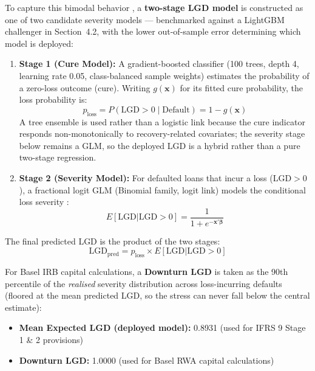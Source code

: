 \documentclass[11pt,a4paper]{article}
\begin{document}
To capture this bimodal behavior \parencite{schuermann2004}, a \textbf{two-stage LGD model} is constructed as one of two candidate severity models --- benchmarked against a LightGBM challenger in Section~4.2, with the lower out-of-sample error determining which model is deployed:
\begin{enumerate}
    \item \textbf{Stage 1 (Cure Model):} A gradient-boosted classifier (100 trees, depth 4, learning rate 0.05, class-balanced sample weights) estimates the probability of a zero-loss outcome (cure). Writing $g(\mathbf{x})$ for its fitted cure probability, the loss probability is:
    \begin{equation}
    p_{\text{loss}} = P(\text{LGD} > 0 \mid \text{Default}) = 1 - g(\mathbf{x})
    \end{equation}
    A tree ensemble is used rather than a logistic link because the cure indicator responds non-monotonically to recovery-related covariates; the severity stage below remains a GLM, so the deployed LGD is a hybrid rather than a pure two-stage regression.
    \item \textbf{Stage 2 (Severity Model):} For defaulted loans that incur a loss ($\text{LGD} > 0$), a fractional logit GLM (Binomial family, logit link) models the conditional loss severity \parencite{papke1996,bellotti2012}:
    \begin{equation}
    E[\text{LGD} | \text{LGD} > 0] = \frac{1}{1 + e^{-\mathbf{x}' \boldsymbol{\beta}}}
    \end{equation}
\end{enumerate}
The final predicted LGD is the product of the two stages:
\begin{equation}
\text{LGD}_{\text{pred}} = p_{\text{loss}} \times E[\text{LGD} | \text{LGD} > 0]
\end{equation}

For Basel IRB capital calculations, a \textbf{Downturn LGD} is taken as the 90th percentile of the \emph{realised} severity distribution across loss-incurring defaults (floored at the mean predicted LGD, so the stress can never fall below the central estimate):
\begin{itemize}
    \item \textbf{Mean Expected LGD (deployed model):} 0.8931 (used for IFRS 9 Stage 1 \& 2 provisions)
    \item \textbf{Downturn LGD:} 1.0000 (used for Basel RWA capital calculations)
\end{itemize}
\end{document}
